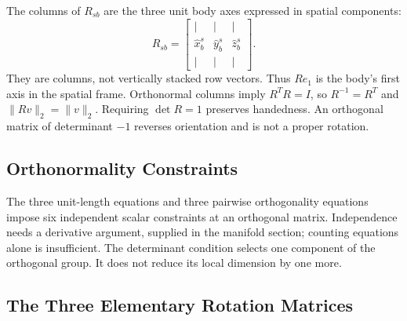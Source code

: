 The columns of $R_{sb}$ are the three unit body axes expressed in spatial components:
\begin{equation}
 R_{sb}=\begin{bmatrix}|&|&|\\ \hat x_b^s&\hat y_b^s&\hat z_b^s\\|&|&|\end{bmatrix}.
 \label{eq:rotation_matrix_def}
\end{equation}
They are columns, not vertically stacked row vectors. Thus $Re_1$ is the body's first axis in the spatial frame. Orthonormal columns imply $R^TR=I$, so $R^{-1}=R^T$ and $\|Rv\|_2=\|v\|_2$. Requiring $\det R=1$ preserves handedness. An orthogonal matrix of determinant $-1$ reverses orientation and is not a proper rotation.

\subsection{Orthonormality Constraints}
\label{thm:orthonormality}

The three unit-length equations and three pairwise orthogonality equations impose six independent scalar constraints at an orthogonal matrix. Independence needs a derivative argument, supplied in the manifold section; counting equations alone is insufficient. The determinant condition selects one component of the orthogonal group. It does not reduce its local dimension by one more.

\subsection{The Three Elementary Rotation Matrices}
\label{thm:rotation_x_axis}
\label{thm:rotation_y_axis}
\label{thm:rotation_z_axis}

